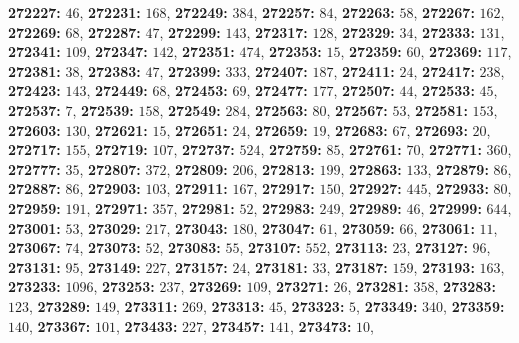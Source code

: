 \textsf{\bfseries 272227:} $46$, \textsf{\bfseries 272231:} $168$, \textsf{\bfseries 272249:} $384$, \textsf{\bfseries 272257:} $84$, \textsf{\bfseries 272263:} $58$, \textsf{\bfseries 272267:} $162$, \textsf{\bfseries 272269:} $68$, \textsf{\bfseries 272287:} $47$, \textsf{\bfseries 272299:} $143$, \textsf{\bfseries 272317:} $128$, \textsf{\bfseries 272329:} $34$, \textsf{\bfseries 272333:} $131$, \textsf{\bfseries 272341:} $109$, \textsf{\bfseries 272347:} $142$, \textsf{\bfseries 272351:} $474$, \textsf{\bfseries 272353:} $15$, \textsf{\bfseries 272359:} $60$, \textsf{\bfseries 272369:} $117$, \textsf{\bfseries 272381:} $38$, \textsf{\bfseries 272383:} $47$, \textsf{\bfseries 272399:} $333$, \textsf{\bfseries 272407:} $187$, \textsf{\bfseries 272411:} $24$, \textsf{\bfseries 272417:} $238$, \textsf{\bfseries 272423:} $143$, \textsf{\bfseries 272449:} $68$, \textsf{\bfseries 272453:} $69$, \textsf{\bfseries 272477:} $177$, \textsf{\bfseries 272507:} $44$, \textsf{\bfseries 272533:} $45$, \textsf{\bfseries 272537:} $7$, \textsf{\bfseries 272539:} $158$, \textsf{\bfseries 272549:} $284$, \textsf{\bfseries 272563:} $80$, \textsf{\bfseries 272567:} $53$, \textsf{\bfseries 272581:} $153$, \textsf{\bfseries 272603:} $130$, \textsf{\bfseries 272621:} $15$, \textsf{\bfseries 272651:} $24$, \textsf{\bfseries 272659:} $19$, \textsf{\bfseries 272683:} $67$, \textsf{\bfseries 272693:} $20$, \textsf{\bfseries 272717:} $155$, \textsf{\bfseries 272719:} $107$, \textsf{\bfseries 272737:} $524$, \textsf{\bfseries 272759:} $85$, \textsf{\bfseries 272761:} $70$, \textsf{\bfseries 272771:} $360$, \textsf{\bfseries 272777:} $35$, \textsf{\bfseries 272807:} $372$, \textsf{\bfseries 272809:} $206$, \textsf{\bfseries 272813:} $199$, \textsf{\bfseries 272863:} $133$, \textsf{\bfseries 272879:} $86$, \textsf{\bfseries 272887:} $86$, \textsf{\bfseries 272903:} $103$, \textsf{\bfseries 272911:} $167$, \textsf{\bfseries 272917:} $150$, \textsf{\bfseries 272927:} $445$, \textsf{\bfseries 272933:} $80$, \textsf{\bfseries 272959:} $191$, \textsf{\bfseries 272971:} $357$, \textsf{\bfseries 272981:} $52$, \textsf{\bfseries 272983:} $249$, \textsf{\bfseries 272989:} $46$, \textsf{\bfseries 272999:} $644$, \textsf{\bfseries 273001:} $53$, \textsf{\bfseries 273029:} $217$, \textsf{\bfseries 273043:} $180$, \textsf{\bfseries 273047:} $61$, \textsf{\bfseries 273059:} $66$, \textsf{\bfseries 273061:} $11$, \textsf{\bfseries 273067:} $74$, \textsf{\bfseries 273073:} $52$, \textsf{\bfseries 273083:} $55$, \textsf{\bfseries 273107:} $552$, \textsf{\bfseries 273113:} $23$, \textsf{\bfseries 273127:} $96$, \textsf{\bfseries 273131:} $95$, \textsf{\bfseries 273149:} $227$, \textsf{\bfseries 273157:} $24$, \textsf{\bfseries 273181:} $33$, \textsf{\bfseries 273187:} $159$, \textsf{\bfseries 273193:} $163$, \textsf{\bfseries 273233:} $1096$, \textsf{\bfseries 273253:} $237$, \textsf{\bfseries 273269:} $109$, \textsf{\bfseries 273271:} $26$, \textsf{\bfseries 273281:} $358$, \textsf{\bfseries 273283:} $123$, \textsf{\bfseries 273289:} $149$, \textsf{\bfseries 273311:} $269$, \textsf{\bfseries 273313:} $45$, \textsf{\bfseries 273323:} $5$, \textsf{\bfseries 273349:} $340$, \textsf{\bfseries 273359:} $140$, \textsf{\bfseries 273367:} $101$, \textsf{\bfseries 273433:} $227$, \textsf{\bfseries 273457:} $141$, \textsf{\bfseries 273473:} $10$, 
